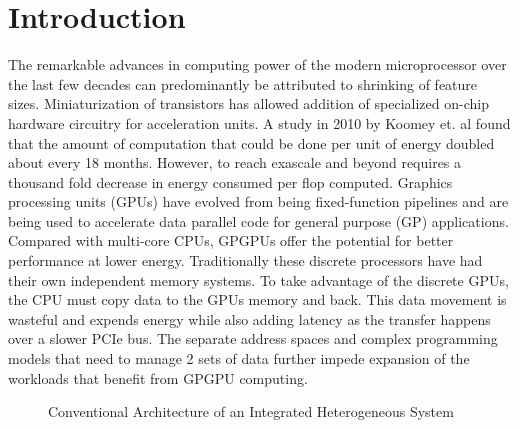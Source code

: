 \section{Introduction}\label{introduction}



\par The remarkable advances in computing power of the modern microprocessor over the last few decades can predominantly be attributed to shrinking of feature sizes. Miniaturization of transistors has allowed addition of specialized on-chip hardware circuitry for acceleration units. 
A study in 2010 by Koomey et. al \cite{koomey} found that the amount of computation that could be done per unit of energy doubled about every 18 months. However, to reach exascale and beyond requires a thousand fold decrease in energy consumed per flop computed. Graphics processing units (GPUs) have evolved from being fixed-function pipelines and are being used to accelerate data parallel code for general purpose (GP) applications. Compared with multi-core CPUs, GPGPUs offer the potential for better performance at lower energy. Traditionally these discrete processors have had their own independent memory systems. To take advantage of the discrete GPUs, the CPU must copy data to the GPUs memory and back. This data movement is wasteful and expends energy while also adding latency as the transfer happens over a slower PCIe bus. The separate address spaces and complex programming models that need to manage 2 sets of data further impede expansion of the workloads that benefit from GPGPU computing. 
\begin{figure}[!htb]
    \centering
    \def\svgwidth{\columnwidth}
    
    \caption{Conventional Architecture of an Integrated Heterogeneous System}
    \label{fig:hsa-arch}
\end{figure}

